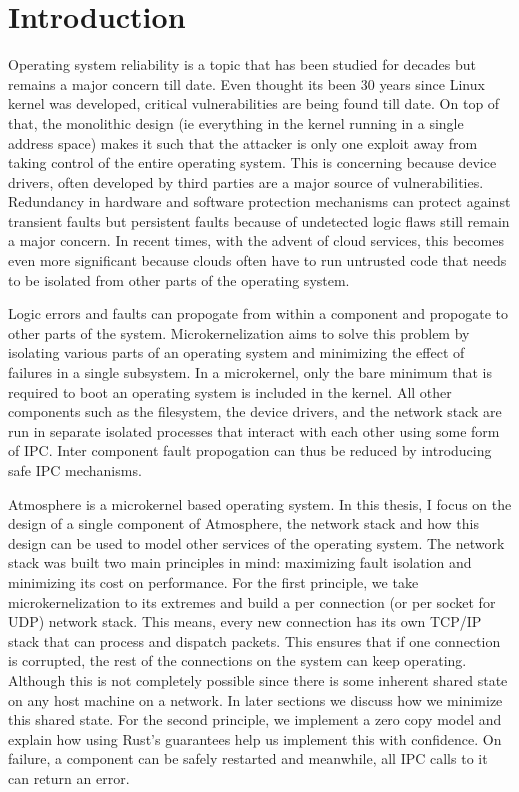 
\chapter{Introduction} %

\label{Chapter1} %


Operating system reliability is a topic that has been studied for decades but remains a major concern till date. Even thought its been 30 years since Linux kernel was developed, critical vulnerabilities are being found till date. On top of that, the monolithic design (ie everything in the kernel running in a single address space) makes it such that the attacker is only one exploit away from taking control of the entire operating system. This is concerning because device drivers, often developed by third parties are a major source of vulnerabilities. Redundancy in hardware and software protection mechanisms can protect against transient faults but persistent faults because of undetected logic flaws still remain a major concern. In recent times, with the advent of cloud services, this becomes even more significant because clouds often have to run untrusted code that needs to be isolated from other parts of the operating system.

Logic errors and faults can propogate from within a component and propogate to other parts of the system. Microkernelization aims to solve this problem by isolating various parts of an operating system and minimizing the effect of failures in a single subsystem. In a microkernel, only the bare minimum that is required to boot an operating system is included in the kernel. All other components such as the filesystem, the device drivers, and the network stack are run in separate isolated processes that interact with each other using some form of IPC. Inter component fault propogation can thus be reduced by introducing safe IPC mechanisms.

Atmosphere is a microkernel based operating system. In this thesis, I focus on the design of a single component of Atmosphere, the network stack and how this design can be used to model other services of the operating system. The network stack was built two main principles in mind: maximizing fault isolation and minimizing its cost on performance. For the first principle, we take microkernelization to its extremes and build a per connection (or per socket for UDP) network stack. This means, every new connection has its own TCP/IP stack that can process and dispatch packets. This ensures that if one connection is corrupted, the rest of the connections on the system can keep operating. Although this is not completely possible since there is some inherent shared state on any host machine on a network. In later sections we discuss how we minimize this shared state. For the second principle, we implement a zero copy model and explain how using Rust's guarantees help us implement this with confidence. On failure, a component can be safely restarted and meanwhile, all IPC calls to it can return an error. 

